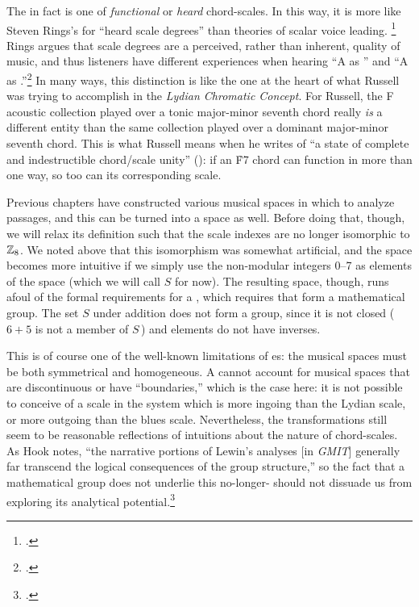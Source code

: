 The \gis in fact is one of \emph{functional} or \emph{heard} chord-scales. In
this way, it is more like Steven Rings's \gis for ``heard scale degrees'' than
theories of scalar voice leading. \footcite[44--50 and throughout]{rings:2011}
Rings argues that scale degrees are a perceived, rather than inherent, quality
of music, and thus listeners have different experiences when hearing ``A as
'' and ``A as .''\footcite[42]{rings:2011} In many ways, this
distinction is like the one at the heart of what Russell was trying to
accomplish in the \emph{Lydian Chromatic Concept}. For Russell, the F acoustic
collection played over a tonic major-minor seventh chord really \emph{is} a
different entity than the same collection played over a dominant major-minor
seventh chord. This is what Russell means when he writes of ``a state of
complete and indestructible chord/scale unity'' (): if an \h{F7} chord
can function in more than one way, so too can its corresponding scale.

Previous chapters have constructed various musical spaces in which to analyze
passages, and this \gis can be turned into a space as well. Before doing that,
though, we will relax its definition such that the scale indexes are no longer
isomorphic to $\mathbb{Z}_8$. We noted above that this isomorphism was somewhat
artificial, and the space becomes more intuitive if we simply use the
non-modular integers 0--7 as elements of the space (which we will call $S$ for
now). The resulting space, though, runs afoul of the formal requirements for a
\gis, which requires that \ivls form a mathematical group. The set $S$ under
addition does not form a group, since it is not closed ($6+5$ is not a member
of $S$\,) and elements do not have inverses.

This is of course one of the well-known limitations of \gis{}es: the musical
spaces must be both symmetrical and homogeneous. A \gis cannot account for
musical spaces that are discontinuous or have ``boundaries,'' which is the
case here: it is not possible to conceive of a scale in the system which is
more ingoing than the Lydian scale, or more outgoing than the blues
scale. Nevertheless, the transformations still seem
to be reasonable reflections of intuitions about the nature of chord-scales.
As Hook notes, ``the narrative portions of Lewin's analyses [in \emph{GMIT}]
generally far transcend the logical consequences of the group structure,'' so
the fact that a mathematical group does not underlie this no-longer-\gis
should not dissuade us from exploring its analytical
potential.\footcite[185]{hook:2007gmit}

